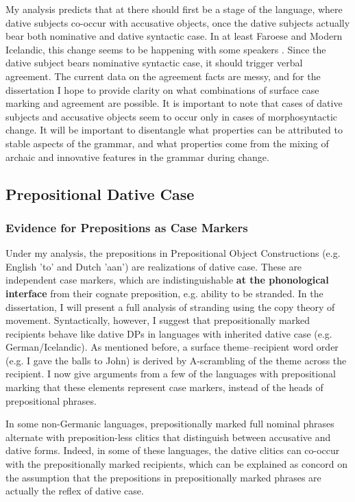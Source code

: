 My analysis predicts that at there should first be a stage of the language, where dative subjects co-occur with accusative objects, once the dative subjects actually bear both nominative and dative syntactic case. In at least Faroese and Modern Icelandic, this change seems to be happening with some speakers \citep{Arnadottir.2013}. Since the dative subject bears nominative syntactic case, it should trigger verbal agreement. The current data on the agreement facts are messy, and for the dissertation I hope to provide clarity on what combinations of surface case marking and agreement are possible. It is important to note that cases of dative subjects and accusative objects seem to occur only in cases of morphosyntactic change. It will be important to disentangle what properties can be attributed to stable aspects of the grammar, and what properties come from the mixing of archaic and innovative features in the grammar during change.

\subsection{Prepositional Dative Case}
\subsubsection{Evidence for Prepositions as Case Markers}


Under my analysis, the prepositions in Prepositional Object Constructions (e.g. English 'to' and Dutch 'aan') are realizations of dative case. These are independent case markers, which are indistinguishable \textbf{at the phonological interface} from their cognate preposition, e.g. ability to be stranded. In the dissertation, I will present a full analysis of stranding using the copy theory of movement. Syntactically, however, I suggest that prepositionally marked recipients behave like dative DPs in languages with inherited dative case (e.g. German/Icelandic). As mentioned before, a surface theme--recipient word order (e.g. I gave the balls to John) is derived by A-scrambling of the theme across the recipient. I now give arguments from a few of the languages with prepositional marking that these elements represent case markers, instead of the heads of prepositional phrases.

In some non-Germanic languages, prepositionally marked full nominal phrases alternate with preposition-less clitics that distinguish between accusative and dative forms. Indeed, in some of these languages, the dative clitics can co-occur with the prepositionally marked recipients, which can be explained as concord on the assumption that the prepositions in prepositionally marked phrases are actually the reflex of dative case.

